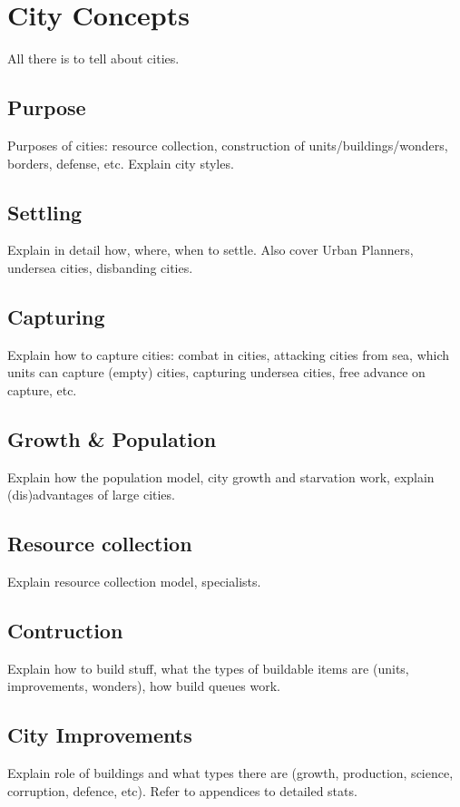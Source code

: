 \chapter{City Concepts}
All there is to tell about cities.

\section{Purpose}
Purposes of cities: resource collection, construction of
units/buildings/wonders, borders, defense, etc. Explain city styles.

\section{Settling}
Explain in detail how, where, when to settle. Also cover Urban Planners,
undersea cities, disbanding cities. 

\section{Capturing}
Explain how to capture cities: combat in cities, attacking cities from sea,
which units can capture (empty) cities, capturing undersea cities, free advance
on capture, etc.

\section{Growth \& Population}
Explain how the population model, city growth and starvation work, explain
(dis)advantages of large cities.

\section{Resource collection}
Explain resource collection model, specialists.

\section{Contruction}
Explain how to build stuff, what the types of buildable items are (units,
improvements, wonders), how build queues work.

\section{City Improvements}
Explain role of buildings and what types there are (growth, production,
science, corruption, defence, etc). Refer to appendices to detailed stats.

